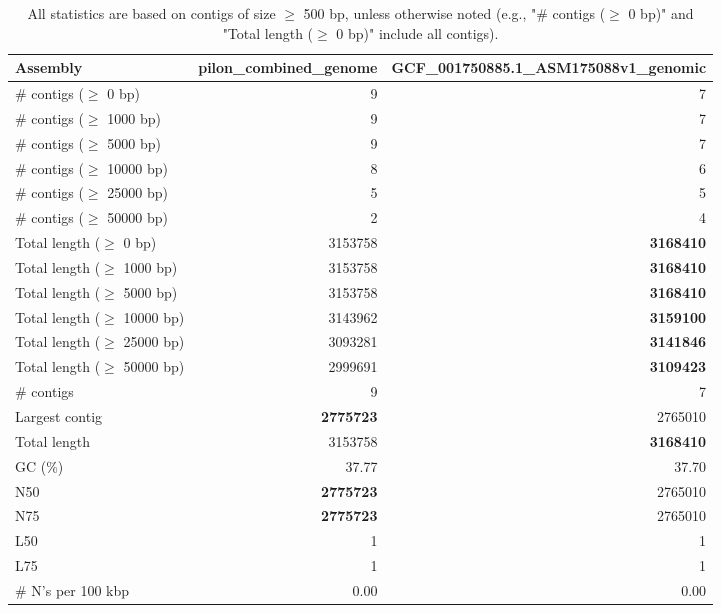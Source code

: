 \documentclass[12pt,a4paper]{article}
\begin{document}
\begin{table}[ht]
\begin{center}
\caption{All statistics are based on contigs of size $\geq$ 500 bp, unless otherwise noted (e.g., "\# contigs ($\geq$ 0 bp)" and "Total length ($\geq$ 0 bp)" include all contigs).}
\begin{tabular}{|l*{2}{|r}|}
\hline
Assembly & pilon\_combined\_genome & GCF\_001750885.1\_ASM175088v1\_genomic \\ \hline
\# contigs ($\geq$ 0 bp) & 9 & 7 \\ \hline
\# contigs ($\geq$ 1000 bp) & 9 & 7 \\ \hline
\# contigs ($\geq$ 5000 bp) & 9 & 7 \\ \hline
\# contigs ($\geq$ 10000 bp) & 8 & 6 \\ \hline
\# contigs ($\geq$ 25000 bp) & 5 & 5 \\ \hline
\# contigs ($\geq$ 50000 bp) & 2 & 4 \\ \hline
Total length ($\geq$ 0 bp) & 3153758 & {\bf 3168410} \\ \hline
Total length ($\geq$ 1000 bp) & 3153758 & {\bf 3168410} \\ \hline
Total length ($\geq$ 5000 bp) & 3153758 & {\bf 3168410} \\ \hline
Total length ($\geq$ 10000 bp) & 3143962 & {\bf 3159100} \\ \hline
Total length ($\geq$ 25000 bp) & 3093281 & {\bf 3141846} \\ \hline
Total length ($\geq$ 50000 bp) & 2999691 & {\bf 3109423} \\ \hline
\# contigs & 9 & 7 \\ \hline
Largest contig & {\bf 2775723} & 2765010 \\ \hline
Total length & 3153758 & {\bf 3168410} \\ \hline
GC (\%) & 37.77 & 37.70 \\ \hline
N50 & {\bf 2775723} & 2765010 \\ \hline
N75 & {\bf 2775723} & 2765010 \\ \hline
L50 & 1 & 1 \\ \hline
L75 & 1 & 1 \\ \hline
\# N's per 100 kbp & 0.00 & 0.00 \\ \hline
\end{tabular}
\end{center}
\end{table}
\end{document}
